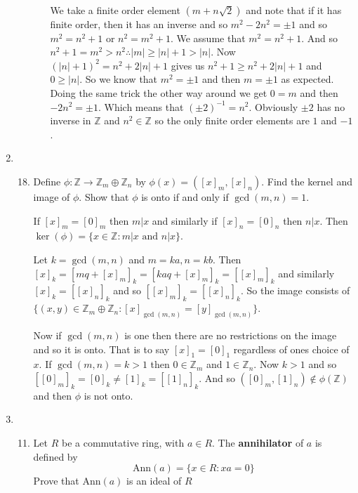 \documentclass[letterpaper]{article}
\begin{document}
\begin{enumerate}
\begin{enumerate}
\begin{enumerate}
    We take a finite order element $(m+n\sqrt{2})$ and note that if it has finite order, then it has an inverse and so $m^2-2n^2=\pm 1$ and so $m^2=n^2+1$ or $n^2=m^2+1$. We assume that $m^2=n^2+1$. And so $n^2+1=m^2> n^2\therefore |m|\ge |n|+1>|n|$. Now $(|n|+1)^2=n^2+2|n|+1$ gives us $n^2+1\ge n^2+2|n|+1$ and $0\ge |n|$. So we know that $m^2=\pm 1$ and then $m=\pm 1$ as expected. Doing the same trick the other way around we get $0=m$ and then $-2n^2=\pm1$. Which means that $(\pm 2)^{-1}=n^2$. Obviously $\pm 2$ has no inverse in $\mathbb{Z}$ and $n^2\in \mathbb{Z}$ so the only finite order elements are $1$ and $-1$.
    \end{enumerate}
  \end{enumerate}
\item
  \begin{enumerate}
  \setcounter{enumii}{17}
  \item
  Define $\phi:\mathbb{Z}\to\mathbb{Z}_m\oplus\mathbb{Z}_n$ by $\phi(x)=([x]_m,[x]_n)$. Find the kernel and image of $\phi$. Show that $\phi$ is onto if and only if $\gcd(m,n)=1$.


  If $[x]_m=[0]_m$ then $m|x$ and similarly if $[x]_n=[0]_n$ then $n|x$. Then $\ker(\phi)=\{x\in \mathbb{Z}:m|x\text{ and }n|x\}$.

  Let $k=\gcd(m,n)$ and $m=ka, n=kb$. Then $[x]_k=[mq+[x]_m]_k=[kaq+[x]_m]_k=[[x]_m]_k$ and similarly $[x]_k=[[x]_n]_k$ and so $[[x]_m]_k=[[x]_n]_k$. So the image consists of $\{(x,y)\in \mathbb{Z}_m\oplus\mathbb{Z}_n:[x]_{\gcd(m,n)}=[y]_{\gcd(m,n)}\}$.
  
  Now if $\gcd(m,n)$ is one then there are no restrictions on the image and so it is onto. That is to say $[x]_1=[0]_1$ regardless of ones choice of $x$. If $\gcd(m,n)=k>1$ then $0\in\mathbb{Z}_m$ and $1\in \mathbb{Z}_n$. Now $k>1$ and so $[[0]_m]_k=[0]_k\ne[1]_k=[[1]_n]_k$. And so $([0]_m,[1]_n)\not\in\phi(\mathbb{Z})$ and then $\phi$ is not onto.
  \end{enumerate}
\item
  \begin{enumerate}
  \setcounter{enumii}{10}
  \item
  Let $R$ be a commutative ring, with $a\in R$. The {\bfseries annihilator} of $a$ is defined by
  \[\text{Ann}(a)=\{x\in R:xa=0\}\]
  Prove that $\text{Ann}(a)$ is an ideal of $R$

\end{enumerate}
\end{enumerate}
\end{document}

